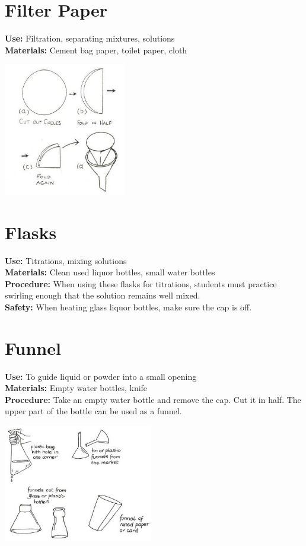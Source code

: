 \begin{multicols}{2}
\columnbreak

\section{Filter Paper}
\label{sec:filter-paper}
\vspace{-10pt}
\textbf{Use:} Filtration, separating mixtures, solutions\\
\textbf{Materials:} Cement bag paper, toilet paper, cloth
\begin{center}
\includegraphics[width=0.4\textwidth]{./img/source/filter-paper.jpg}
\end{center}

\section{Flasks}
\label{sec:flasks}
\vspace{-10pt}
\textbf{Use:} Titrations, mixing solutions\\
\textbf{Materials:} Clean used liquor bottles, small water bottles\\
\textbf{Procedure:} When using these flasks for titrations, students must practice swirling enough that the solution remains well mixed. \\
\textbf{Safety:} When heating glass liquor bottles, make sure the cap is off.

\section{Funnel}
\label{sec:funnel}
\vspace{-10pt}
\textbf{Use:} To guide liquid or powder into a small opening\\
\textbf{Materials:} Empty water bottles, knife\\
\textbf{Procedure:} Take an empty water bottle and remove the cap. Cut it in half. The upper part of the bottle can be used as a funnel.  
\begin{center}
\includegraphics[width=0.49\textwidth]{./img/vso/funnels.jpg}
\end{center}


\end{multicols}
